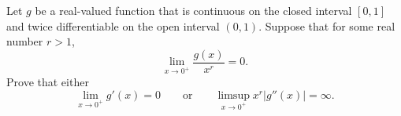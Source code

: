 Let $g$ be a real-valued function that is continuous on the closed interval $[0,1]$ and twice differentiable on 
the open interval $(0,1)$. Suppose that for some real number $r>1$, 
\[
\lim_{x \to 0^+} \frac{g(x)}{x^r} = 0.
\]
Prove that either
\[
\lim_{x \to 0^+} g'(x) = 0 \qquad \mbox{or} \qquad \limsup_{x \to 0^+} x^r |g''(x)| = \infty.
\]
